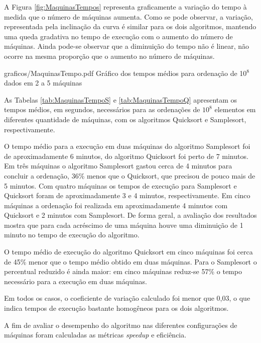A Figura \ref{fig:MaquinasTempos} representa graficamente a variação do tempo à medida que o número
de máquinas aumenta. Como se pode observar, a variação, representada pela inclinação da curva é
similar para os dois algoritmos, mantendo uma queda gradativa no tempo de execução com o aumento
do número de máquinas. Ainda pode-se observar que a diminuição do tempo não é linear, não
ocorre na mesma proporção que o aumento no número de máquinas. 


\begin{defaultFigure}{0.75\textwidth}{graficos/MaquinasTempo.pdf}
{Gráfico dos tempos médios para ordenação de 10$^8$ dados em 2 a 5 máquinas}
\label{fig:MaquinasTempos}
\end{defaultFigure}

As Tabelas \ref{tab:MaquinasTempoS} e \ref{tab:MaquinasTempoQ} apresentam os tempos médios, em
segundos,
necessários para as ordenações de $10^8$ elementos em diferentes quantidade de máquinas, com os
algoritmos Quicksort e Samplesort, respectivamente. 

O tempo médio para a execução em duas máquinas do algoritmo Samplesort foi de aproximadamente 6
minutos, do algoritmo Quicksort foi perto de 7 minutos. Em três máquinas o algoritmo Samplesort
gastou cerca de 4 minutos para concluir a ordenação, 36\% menos que o Quicksort, que precisou
de pouco mais de 5 minutos.
Com quatro máquinas os tempos de execução para Samplesort e Quicksort foram de aproximadamente 3 e 4
minutos, respectivamente.
Em cinco máquinas a ordenação foi realizada em aproximadamente 4 minutos
com Quicksort e 2 minutos com Samplesort. De forma geral, a avaliação dos resultados mostra que
para cada acréscimo de uma máquina houve uma diminuição de 1 minuto no tempo de execução do
algoritmo.





O tempo médio de execução do algoritmo Quicksort em cinco máquinas foi cerca de 45\% menor que o
tempo médio obtido em duas máquinas. 
Para o Samplesort o percentual reduzido é ainda maior: em cinco máquinas reduz-se 57\% o tempo
necessário para a execução em duas máquinas. 

Em todos os casos, o coeficiente de variação calculado foi menor que 0,03, o que indica
tempos de execução bastante homogêneos para os dois algoritmos. 




A fim de avaliar o desempenho do algoritmo nas diferentes configurações de máquinas foram calculadas
as métricas \textit{speedup}
e eficiência.

